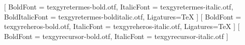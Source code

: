 \usepackage{iftex}
\usepackage{amsmath}							%
\usepackage{amssymb}							%
\usepackage{amsfonts}							%
\usepackage{mathptmx} 							%
\ifXeTeX
  \usepackage{fontspec}
  \setmainfont{texgyretermes-regular.otf}[
    BoldFont        = texgyretermes-bold.otf,
    ItalicFont      = texgyretermes-italic.otf,
    BoldItalicFont  = texgyretermes-bolditalic.otf,
    Ligatures=TeX
  ]
  \setsansfont{texgyreheros-regular.otf}[
    BoldFont   = texgyreheros-bold.otf,
    ItalicFont = texgyreheros-italic.otf,
    Ligatures=TeX
  ]
  \setmonofont{texgyrecursor-regular.otf}[
    BoldFont   = texgyrecursor-bold.otf,
    ItalicFont = texgyrecursor-italic.otf
  ]
\else
  \usepackage[T1]{fontenc}						%
  \usepackage[utf8]{inputenc}					%
\fi
\usepackage{lastpage}							%
\usepackage{indentfirst}						%
\usepackage[dvipsnames,table]{xcolor}			%
\usepackage{graphicx}							%
\usepackage{microtype} 							%
\usepackage{lipsum}								%
\usepackage[brazilian,hyperpageref]{backref}	%
\usepackage[alf,abnt-emphasize=bf,abnt-full-initials=yes]{abntex2cite}
\usepackage{booktabs}
\usepackage{url} %

